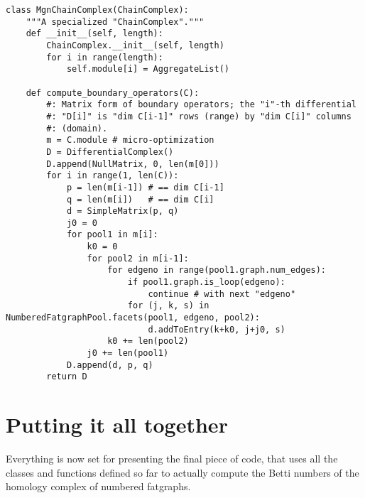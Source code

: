 \begin{lstlisting}
class MgnChainComplex(ChainComplex):
    """A specialized "ChainComplex"."""
    def __init__(self, length):
        ChainComplex.__init__(self, length)
        for i in range(length):
            self.module[i] = AggregateList()

    def compute_boundary_operators(C):
        #: Matrix form of boundary operators; the "i"-th differential
        #: "D[i]" is "dim C[i-1]" rows (range) by "dim C[i]" columns
        #: (domain).
        m = C.module # micro-optimization
        D = DifferentialComplex()
        D.append(NullMatrix, 0, len(m[0]))
        for i in range(1, len(C)):
            p = len(m[i-1]) # == dim C[i-1]
            q = len(m[i])   # == dim C[i]
            d = SimpleMatrix(p, q)
            j0 = 0
            for pool1 in m[i]:
                k0 = 0
                for pool2 in m[i-1]:
                    for edgeno in range(pool1.graph.num_edges):
                        if pool1.graph.is_loop(edgeno):
                            continue # with next "edgeno"
                        for (j, k, s) in NumberedFatgraphPool.facets(pool1, edgeno, pool2):
                            d.addToEntry(k+k0, j+j0, s)
                    k0 += len(pool2)
                j0 += len(pool1)
            D.append(d, p, q)
        return D

\end{lstlisting}

\section{Putting it all together}
\label{sec:algorithm-finale}

Everything is now set for presenting the final piece of code, that
uses all the classes and functions defined so far to actually compute
the Betti numbers of the homology complex of numbered fatgraphs.

